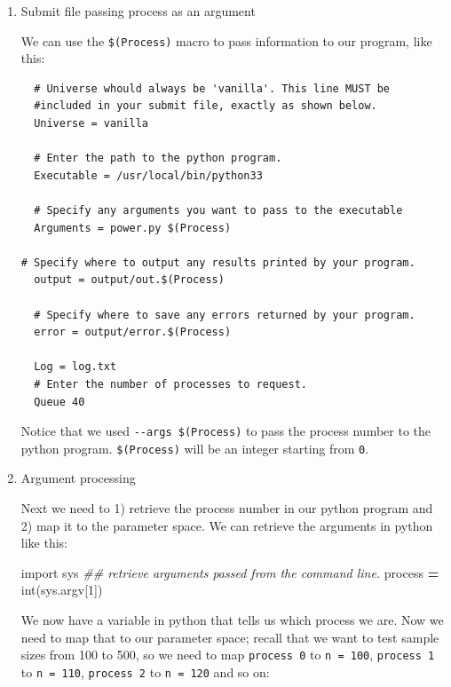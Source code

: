 \documentclass[
]{book}
\newenvironment{Shaded}{\begin{snugshade}}{\end{snugshade}}
\newcommand{\BuiltInTok}[1]{#1}
\newcommand{\CommentTok}[1]{\textcolor[rgb]{0.56,0.35,0.01}{\textit{#1}}}
\newcommand{\DecValTok}[1]{\textcolor[rgb]{0.00,0.00,0.81}{#1}}
\newcommand{\ImportTok}[1]{#1}
\newcommand{\NormalTok}[1]{#1}
\newcommand{\OperatorTok}[1]{\textcolor[rgb]{0.81,0.36,0.00}{\textbf{#1}}}
\begin{document}
\begin{enumerate}
\def\labelenumi{\arabic{enumi}.}
\item
  Submit file passing process as an argument

  We can use the \texttt{\$(Process)} macro to pass information to our
  program, like this:

\begin{verbatim}
  # Universe whould always be 'vanilla'. This line MUST be
  #included in your submit file, exactly as shown below.
  Universe = vanilla

  # Enter the path to the python program.
  Executable = /usr/local/bin/python33

  # Specify any arguments you want to pass to the executable
  Arguments = power.py $(Process)

# Specify where to output any results printed by your program.
  output = output/out.$(Process)

  # Specify where to save any errors returned by your program.
  error = output/error.$(Process)

  Log = log.txt
  # Enter the number of processes to request.
  Queue 40
\end{verbatim}

  Notice that we used \texttt{-\/-args\ \$(Process)} to pass the process number
  to the python program. \texttt{\$(Process)} will be an integer starting from
  \texttt{0}.
\item
  Argument processing

  Next we need to 1) retrieve the process number in our python program
  and 2) map it to the parameter space. We can retrieve the arguments
  in python like this:

\begin{Shaded}
\begin{Highlighting}[]
\ImportTok{import}\NormalTok{ sys}
\CommentTok{\#\# retrieve arguments passed from the command line.}
\NormalTok{process }\OperatorTok{=} \BuiltInTok{int}\NormalTok{(sys.argv[}\DecValTok{1}\NormalTok{])}
\end{Highlighting}
\end{Shaded}

  We now have a variable in python that tells us which process we are.
  Now we need to map that to our parameter space; recall that we want
  to test sample sizes from 100 to 500, so we need to map \texttt{process\ 0}
  to \texttt{n\ =\ 100}, \texttt{process\ 1} to \texttt{n\ =\ 110}, \texttt{process\ 2} to \texttt{n\ =\ 120} and
  so on:


\end{enumerate}
\end{document}

